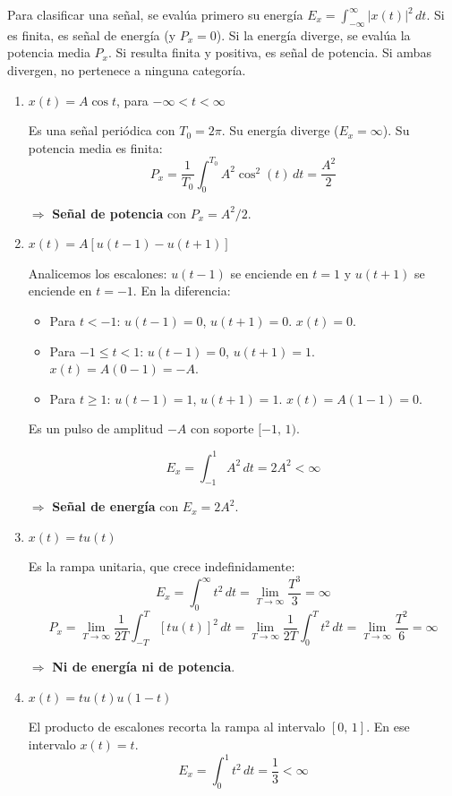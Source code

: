 \documentclass[10pt,a4paper]{article}
\begin{document}
	Para clasificar una señal, se evalúa primero su energía $E_x = \int_{-\infty}^{\infty}|x(t)|^2\,dt$. Si es finita, es señal de energía (y $P_x=0$). Si la energía diverge, se evalúa la potencia media $P_x$. Si resulta finita y positiva, es señal de potencia. Si ambas divergen, no pertenece a ninguna categoría.
	
	\begin{enumerate}[label=\textbf{\alph*)}]
		\item $x(t)=A\cos t$, para $-\infty<t<\infty$
		
		Es una señal periódica con $T_0 = 2\pi$. Su energía diverge ($E_x = \infty$). Su potencia media es finita:
		\[
		P_x = \frac{1}{T_0}\int_0^{T_0} A^2\cos^2(t)\,dt = \frac{A^2}{2}
		\]
		
		$\Rightarrow$ \textbf{Señal de potencia} con $P_x = A^2/2$.
		
		\item $x(t)=A[u(t-1)-u(t+1)]$
		
		Analicemos los escalones: $u(t-1)$ se enciende en $t=1$ y $u(t+1)$ se enciende en $t=-1$. En la diferencia:
		\begin{itemize}
		    \item Para $t<-1$: $u(t-1)=0$, $u(t+1)=0$. $x(t)=0$.
		    \item Para $-1\leq t<1$: $u(t-1)=0$, $u(t+1)=1$. $x(t)=A(0-1)=-A$.
		    \item Para $t\geq 1$: $u(t-1)=1$, $u(t+1)=1$. $x(t)=A(1-1)=0$.
		\end{itemize}
		
		Es un pulso de amplitud $-A$ con soporte $[-1,\, 1)$.
		
		\[
		E_x = \int_{-1}^{1} A^2\,dt = 2A^2 < \infty
		\]
		
		$\Rightarrow$ \textbf{Señal de energía} con $E_x = 2A^2$.
		
		\item $x(t)=tu(t)$
		
		Es la rampa unitaria, que crece indefinidamente:
		\[
		E_x = \int_0^{\infty} t^2\,dt = \lim_{T\to\infty}\frac{T^3}{3} = \infty
		\]
		\[
		P_x = \lim_{T\to\infty}\frac{1}{2T}\int_{-T}^{T} [tu(t)]^2\,dt = \lim_{T\to\infty}\frac{1}{2T}\int_0^{T} t^2\,dt = \lim_{T\to\infty}\frac{T^2}{6} = \infty
		\]
		
		$\Rightarrow$ \textbf{Ni de energía ni de potencia}.
		
		\item $x(t)=tu(t)u(1-t)$
		
		El producto de escalones recorta la rampa al intervalo $[0,\, 1]$. En ese intervalo $x(t)=t$.
		\[
		E_x = \int_0^{1} t^2\,dt = \frac{1}{3} < \infty
		\]
		

\end{enumerate}
\end{document}
